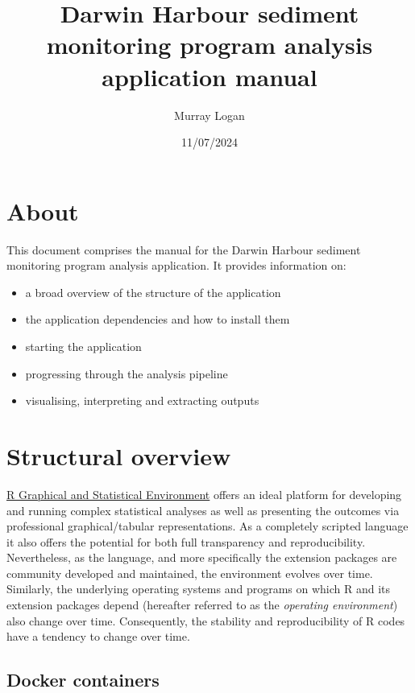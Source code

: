 \documentclass[
  8pt,
  a4paper]{article}
\title{Darwin Harbour sediment monitoring program analysis application
manual}
\author{Murray Logan}
\date{11/07/2024}
\providecommand{\tightlist}{%
  \setlength{\itemsep}{0pt}\setlength{\parskip}{0pt}}\usepackage{longtable,booktabs,array}
\renewcommand*\contentsname{Table of contents}
\newcommand\contentsname{Table of contents}
\begin{document}
\maketitle

\renewcommand*\contentsname{Table of contents}
{
\hypersetup{linkcolor=}
\setcounter{tocdepth}{3}
\tableofcontents
}

\section{About}\label{about}

This document comprises the manual for the Darwin Harbour sediment
monitoring program analysis application. It provides information on:

\begin{itemize}
\tightlist
\item
  a broad overview of the structure of the application
\item
  the application dependencies and how to install them
\item
  starting the application
\item
  progressing through the analysis pipeline
\item
  visualising, interpreting and extracting outputs
\end{itemize}

\section{Structural overview}\label{structural-overview}

\href{https://www.r-project.org/}{R Graphical and Statistical
Environment} offers an ideal platform for developing and running complex
statistical analyses as well as presenting the outcomes via professional
graphical/tabular representations. As a completely scripted language it
also offers the potential for both full transparency and
reproducibility. Nevertheless, as the language, and more specifically
the extension packages are community developed and maintained, the
environment evolves over time. Similarly, the underlying operating
systems and programs on which R and its extension packages depend
(hereafter referred to as the \emph{operating environment}) also change
over time. Consequently, the stability and reproducibility of R codes
have a tendency to change over time.

\subsection{Docker containers}\label{docker-containers}
\end{document}
